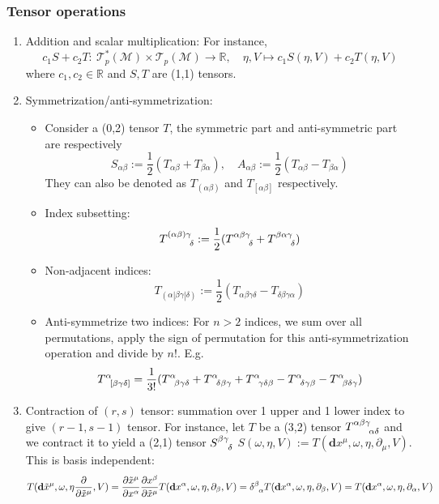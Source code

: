 \documentclass[a4paper]{article}
\theoremstyle{new}
\begin{document}
\subsubsection{Tensor operations}
\begin{enumerate}
    \item Addition and scalar multiplication: For instance,
    $$c_1S+c_2T:~\mathcal{T}_p^*(\mathcal{M})\times \mathcal{T}_p(\mathcal{M})\rightarrow\mathbb{R},\quad\eta,V\mapsto c_1S(\eta,V)+c_2T(\eta,V)$$
    where $c_1,c_2\in\mathbb{R}$ and $S,T$ are (1,1) tensors.
    \item Symmetrization/anti-symmetrization:
    \begin{itemize}
        \item Consider a (0,2) tensor $T$, the symmetric part and anti-symmetric part are respectively
        $$S_{\alpha\beta}:=\frac{1}{2}(T_{\alpha\beta}+T_{\beta\alpha}),\quad A_{\alpha\beta}:=\frac{1}{2}(T_{\alpha\beta}-T_{\beta\alpha})$$
        They can also be denoted as $T_{(\alpha\beta)}$ and $T_{[\alpha\beta]}$ respectively.
        \item Index subsetting:
        $$\tensor*{T}{*_{   }^{(\alpha\beta)\gamma}_{\delta}}:=\frac{1}{2}(\tensor*{T}{*_{   }^{\alpha\beta\gamma}_{\delta}}+\tensor*{T}{*_{   }^{\beta\alpha\gamma}_{\delta}})$$
        \item Non-adjacent indices:
        $$T_{(\alpha|\beta\gamma|\delta)}:=\frac{1}{2}(T_{\alpha\beta\gamma\delta}-T_{\delta\beta\gamma\alpha})$$
        \item Anti-symmetrize two indices: For $n>2$ indices, we sum over all permutations, apply the sign of permutation for this anti-symmetrization operation and divide by $n!$. E.g.
        $$\tensor*{T}{*_{}^{\alpha}_{[\beta\gamma\delta]}}=\frac{1}{3!}(\tensor*{T}{*_{}^{\alpha}_{\beta\gamma\delta}}+\tensor*{T}{*_{}^{\alpha}_{\delta\beta\gamma}}+\tensor*{T}{*_{}^{\alpha}_{\gamma\delta\beta}}-\tensor*{T}{*_{}^{\alpha}_{\delta\gamma\beta}}-\tensor*{T}{*_{}^{\alpha}_{\beta\delta\gamma}})$$
    \end{itemize}
    \item Contraction of $(r,s)$ tensor: summation over 1 upper and 1 lower index to give $(r-1,s-1)$ tensor. For instance, let $T$ be a (3,2) tensor $\tensor*{T}{*_{}^{\alpha\beta\gamma}_{\alpha\delta}}$ and we contract it to yield a (2,1) tensor $\tensor*{S}{*_{}^{\beta\gamma}_{\delta}}$  $S(\omega,\eta,V):=T(\mathbf{d}x^\mu,\omega,\eta,\partial_\mu,V)$. This is basis independent:
    $$T(\mathbf{d}\tilde{x}^\mu,\omega,\eta\frac{\partial}{\partial\tilde{x}^\mu},V)=\frac{\partial\tilde{x}^\mu}{\partial x^\alpha}\frac{\partial x^\beta}{\partial\tilde{x}^\mu}T(\mathbf{d}x^\alpha,\omega,\eta,\partial_\beta,V)=\tensor*{\delta}{*_{}^{\beta}_{\alpha}}T(\mathbf{d}x^\alpha,\omega,\eta,\partial_\beta,V)=T(\mathbf{d}x^\alpha,\omega,\eta,\partial_\alpha,V)$$

\end{enumerate}
\end{document}
